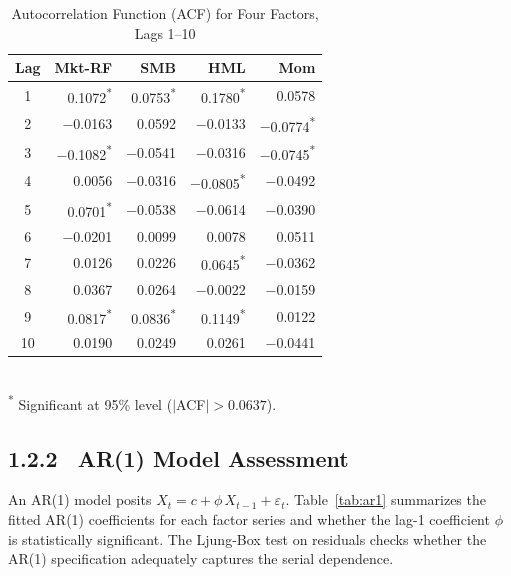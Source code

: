 \documentclass[12pt]{article}
\begin{document}
		\begin{table}[H]
			\centering
			\caption{Autocorrelation Function (ACF) for Four Factors, Lags 1--10}
	\label{tab:acf}
		\begin{tabular}{c r r r r}
			\toprule
			\textbf{Lag} & \textbf{Mkt-RF} & \textbf{SMB} & \textbf{HML} & \textbf{Mom} \\
			\midrule
			 1 &  0.1072\textsuperscript{*} &  0.0753\textsuperscript{*} &  0.1780\textsuperscript{*} &  0.0578 \\
			 2 & $-$0.0163 &  0.0592 & $-$0.0133 & $-$0.0774\textsuperscript{*} \\
			 3 & $-$0.1082\textsuperscript{*} & $-$0.0541 & $-$0.0316 & $-$0.0745\textsuperscript{*} \\
			 4 &  0.0056 & $-$0.0316 & $-$0.0805\textsuperscript{*} & $-$0.0492 \\
			 5 &  0.0701\textsuperscript{*} & $-$0.0538 & $-$0.0614 & $-$0.0390 \\
			 6 & $-$0.0201 &  0.0099 &  0.0078 &  0.0511 \\
			 7 &  0.0126 &  0.0226 &  0.0645\textsuperscript{*} & $-$0.0362 \\
			 8 &  0.0367 &  0.0264 & $-$0.0022 & $-$0.0159 \\
			 9 &  0.0817\textsuperscript{*} &  0.0836\textsuperscript{*} &  0.1149\textsuperscript{*} &  0.0122 \\
			10 &  0.0190 &  0.0249 &  0.0261 & $-$0.0441 \\
			\bottomrule
		\end{tabular}
		\\[4pt]
		\footnotesize \textsuperscript{*} Significant at 95\% level ($|$ACF$| > 0.0637$).
	\end{table}
	
	\subsection{1.2.2 \ AR(1) Model Assessment}
	
	An AR(1) model posits $X_t = c + \phi \, X_{t-1} + \varepsilon_t$. Table~\ref{tab:ar1} summarizes the fitted AR(1) coefficients for each factor series and whether the lag-1 coefficient $\phi$ is statistically significant. The Ljung-Box test on residuals checks whether the AR(1) specification adequately captures the serial dependence.
	
\end{document}
